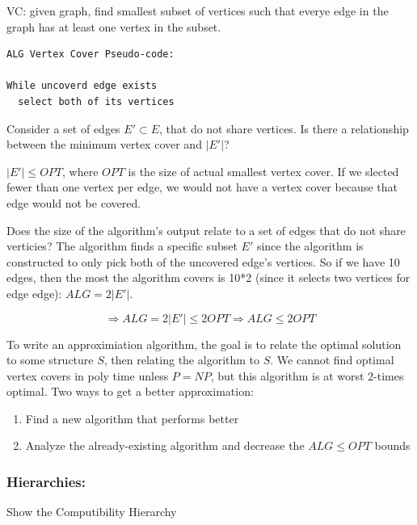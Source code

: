 \documentclass[11pt]{article}
\begin{document}
VC: given graph, find smallest subset of vertices such that everye edge in the graph has at least one vertex in the subset. 

\begin{verbatim}
ALG Vertex Cover Pseudo-code:

While uncoverd edge exists
  select both of its vertices
\end{verbatim}

Consider a set of edges \(E' \subset E\), that do not share vertices. Is there a relationship between the minimum vertex cover and \(|E'|\)?

\(|E'| \leq OPT\), where \(OPT\) is the size of actual smallest vertex cover. If we slected fewer than one vertex per edge, we would not have a vertex cover because that edge would not be covered. 

Does the size of the algorithm's output relate to a set of edges that do not share verticies? The algorithm finds a specific subset \(E'\) since the algorithm is constructed to only pick both of the uncovered edge's vertices. So if we have 10 edges, then the most the algorithm covers is 10*2 (since it selects two vertices for edge edge): \(ALG = 2|E'|\).


\[ \Longrightarrow ALG = 2 |E'| \leq 2 OPT \Longrightarrow ALG \leq 2 OPT \]

To write an approximiation algorithm, the goal is to relate the optimal solution to some structure \(S\), then relating the algorithm to \(S\).
We cannot find optimal vertex covers in poly time unless \(P = NP\), but this algorithm is at worst 2-times optimal.
Two ways to get a better approximation:
\begin{enumerate}
\item Find a new algorithm that performs better
\item Analyze the already-existing algorithm and decrease the \(ALG \leq OPT\) bounds
\end{enumerate}



\subsubsection{Hierarchies:}
\label{sec:org3e9b6fe}
Show the Computibility Hierarchy
\end{document}
